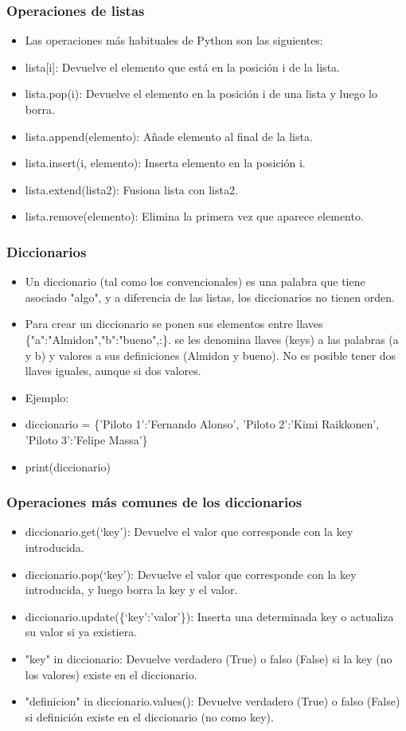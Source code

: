 \documentclass[hyperref={pdfpagelabels=false},xcolor=pst,pdf,fragile]{beamer}
\begin{document}
\begin{frame}
    \frametitle{Operaciones de listas}
    \pause
    \begin{itemize}
    \item Las operaciones más habituales de Python son las siguientes:
    \item lista[i]: Devuelve el elemento que está en la posición i de la lista.
    \item lista.pop(i): Devuelve el elemento en la posición i de una lista y luego lo borra.
    \item lista.append(elemento): Añade elemento al final de la lista.
    \item lista.insert(i, elemento): Inserta elemento en la posición i.
    \item lista.extend(lista2): Fusiona lista con lista2.
    \item lista.remove(elemento): Elimina la primera vez que aparece elemento.
    \end{itemize}
\end{frame}


\begin{frame}
    \frametitle{Diccionarios}
    \pause
    \begin{itemize}
    \item Un diccionario (tal como los convencionales) es una palabra que tiene asociado "algo", y a diferencia de las listas, los diccionarios no tienen orden.
    \item Para crear un diccionario se ponen sus elementos entre llaves \{"a":"Almidon","b":"bueno",:\}. se les denomina llaves (keys) a las palabras (a y b) y valores a sus definiciones (Almidon y bueno). No es posible tener dos llaves iguales, aunque si dos valores.
    \item Ejemplo: 
    \item diccionario = \{'Piloto 1':'Fernando Alonso', 'Piloto 2':'Kimi Raikkonen', 'Piloto 3':'Felipe Massa'\}
    \item print(diccionario)
    \end{itemize}
\end{frame}

\begin{frame}
    \frametitle{Operaciones más comunes de los diccionarios}
    \pause
    \begin{itemize}
    \item diccionario.get(‘key’): Devuelve el valor que corresponde con la key introducida.
    \item diccionario.pop(‘key’): Devuelve el valor que corresponde con la key introducida, y luego borra la key y el valor.
    \item diccionario.update(\{‘key’:’valor’\}): Inserta una determinada key o actualiza su valor si ya existiera.
    \item "key" in diccionario: Devuelve verdadero (True) o falso (False) si la key (no los valores) existe en el diccionario.
    \item "definicion" in diccionario.values(): Devuelve verdadero (True) o falso (False) si definición existe en el diccionario (no como key).
    \end{itemize}
\end{frame}
\end{document}

